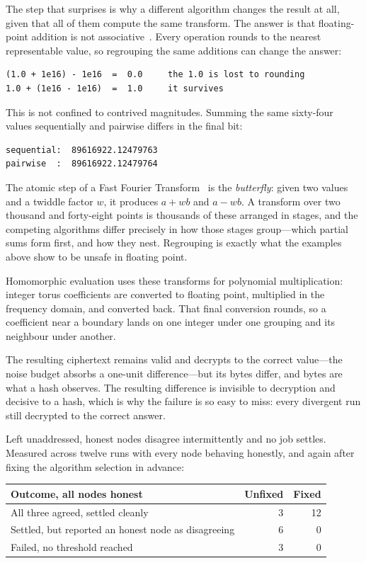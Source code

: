 \documentclass[12pt,a4paper]{article}
\begin{document}
The step that surprises is why a different algorithm changes the result at all, given that all of them compute the same transform.
The answer is that floating-point addition is not associative~\cite{floating_point}.
Every operation rounds to the nearest representable value, so regrouping the same additions can change the answer:

\begin{verbatim}
(1.0 + 1e16) - 1e16  =  0.0     the 1.0 is lost to rounding
1.0 + (1e16 - 1e16)  =  1.0     it survives
\end{verbatim}

This is not confined to contrived magnitudes.
Summing the same sixty-four values sequentially and pairwise differs in the final bit:

\begin{verbatim}
sequential:  89616922.12479763
pairwise  :  89616922.12479764
\end{verbatim}

The atomic step of a Fast Fourier Transform~\cite{cooley_tukey} is the \emph{butterfly}: given two values and a twiddle factor $w$, it produces $a + wb$ and $a - wb$.
A transform over two thousand and forty-eight points is thousands of these arranged in stages, and the competing algorithms differ precisely in how those stages group---which partial sums form first, and how they nest.
Regrouping is exactly what the examples above show to be unsafe in floating point.

Homomorphic evaluation uses these transforms for polynomial multiplication: integer torus coefficients are converted to floating point, multiplied in the frequency domain, and converted back.
That final conversion rounds, so a coefficient near a boundary lands on one integer under one grouping and its neighbour under another.

The resulting ciphertext remains valid and decrypts to the correct value---the noise budget absorbs a one-unit difference---but its bytes differ, and bytes are what a hash observes.
The resulting difference is invisible to decryption and decisive to a hash, which is why the failure is so easy to miss: every divergent run still decrypted to the correct answer.

Left unaddressed, honest nodes disagree intermittently and no job settles.
Measured across twelve runs with every node behaving honestly, and again after fixing the algorithm selection in advance:

\begin{center}
\begin{tabular}{lrr}
\hline
Outcome, all nodes honest & Unfixed & Fixed \\
\hline
All three agreed, settled cleanly & 3 & 12 \\
Settled, but reported an honest node as disagreeing & 6 & 0 \\
Failed, no threshold reached & 3 & 0 \\
\hline
\end{tabular}
\end{center}
\end{document}
